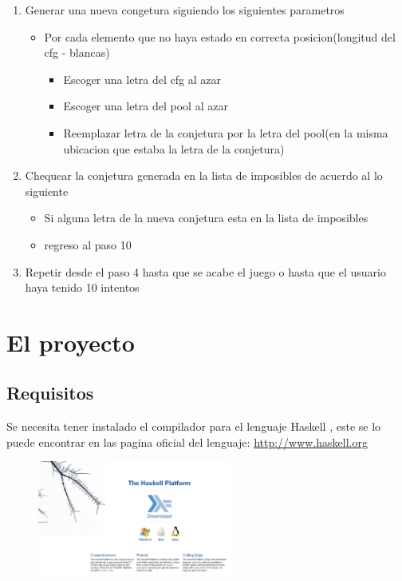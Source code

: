 \begin{enumerate}[1)]
\begin{enumerate}[a)]
    \end{enumerate}
 \item Generar una nueva congetura siguiendo los siguientes parametros
             \begin{itemize}
              \item Por cada elemento que no haya estado en correcta posicion(longitud del cfg - blancas)
                       \begin{itemize}
                           \item Escoger una letra del cfg al azar
                            \item Escoger una letra del pool al azar
                            \item Reemplazar letra de la conjetura por la letra del pool(en la misma ubicacion que estaba la letra de la conjetura)
                        \end{itemize}
              \end{itemize}
 \item Chequear la conjetura generada en la lista de imposibles de acuerdo al lo siguiente
            \begin{itemize}
              \item Si alguna letra de la nueva conjetura esta en la lista de imposibles
               \item regreso al paso 10
              \end{itemize}
 \item Repetir desde el paso 4 hasta que se acabe el juego o hasta que el usuario haya tenido 10 intentos 

\end{enumerate}
  
\section{ El proyecto}

  \subsection{ Requisitos}

Se necesita tener instalado el compilador para el lenguaje Haskell , este se lo puede encontrar en las pagina oficial del lenguaje:
 \url{  http://www.haskell.org}
\begin{figure}[htb]
\centering
\includegraphics[width=0.57\textwidth]{./imagenes5/Dibujo1.png}
\end{figure}

